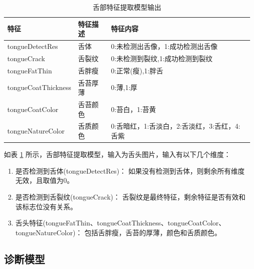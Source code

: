 \begin{table}[h]
    \centering
    \begin{tabular}{lll}
        \toprule
        特征 & 特征描述 & 特征内容 \\ 
        \midrule
        tongueDetectRes & 舌体 & 0:未检测出舌像，1:成功检测出舌像 \\
        tongueCrack & 舌裂纹 & 0:未检测到裂纹,1:成功检测到裂纹 \\ 
        tongueFatThin & 舌胖瘦 & 0:正常(瘦),1:胖舌 \\
        tongueCoatThickness & 舌苔厚薄 & 0:薄,1:厚 \\
        tongueCoatColor & 舌苔颜色 & 0:苔白，1:苔黄 \\
        tongueNatureColor & 舌质颜色 & 0:舌暗红，1:舌淡白，2:舌淡红，3:舌红，4:舌紫\\
        \bottomrule
    \end{tabular}

    \caption{舌部特征提取模型输出}
    \label{tab:tongue-feature}
\end{table}

如表 \ref{tab:tongue-feature} 所示，舌部特征提取模型，输入为舌头图片，输入有以下几个维度：

\begin{enumerate}
    \item 是否检测到舌体(tongueDetectRes)： 如果没有检测到舌体，则剩余所有维度无效，且取值为0。

    \item 是否检测到舌裂纹(tongueCrack)： 舌裂纹是最终特征，剩余特征是否有效和该标志位没有关系。

    \item 舌头特征(tongueFatThin、tongueCoatThickness、tongueCoatColor、tongueNatureColor)： 包括舌胖瘦，舌苔的厚薄，颜色和舌质颜色。

\end{enumerate}

\subsection{诊断模型}

